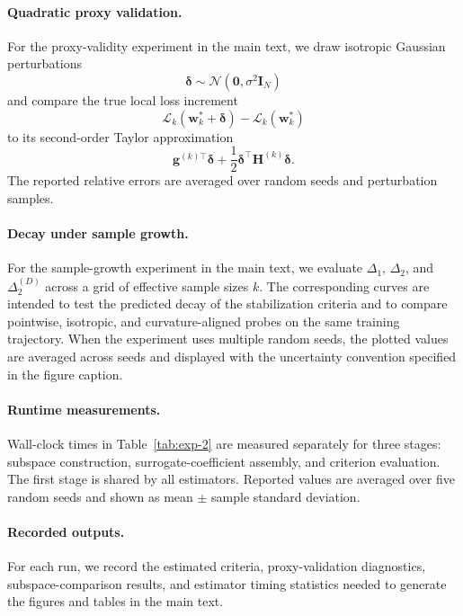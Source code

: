 \documentclass{article}
\begin{document}
\paragraph{Quadratic proxy validation.}
For the proxy-validity experiment in the main text, we draw isotropic Gaussian perturbations
\[
\boldsymbol{\delta}\sim\mathcal N(\mathbf 0,\sigma^2\mathbf I_N)
\]
and compare the true local loss increment
\[
\mathcal L_k(\mathbf w_k^*+\boldsymbol{\delta})-\mathcal L_k(\mathbf w_k^*)
\]
to its second-order Taylor approximation
\[
\mathbf g^{(k)\top}\boldsymbol{\delta}+\frac12\boldsymbol{\delta}^\top \mathbf H^{(k)}\boldsymbol{\delta}.
\]
The reported relative errors are averaged over random seeds and perturbation samples.

\paragraph{Decay under sample growth.}
For the sample-growth experiment in the main text, we evaluate $\Delta_1$, $\Delta_2$, and $\Delta_2^{(D)}$ across a grid of effective sample sizes $k$. The corresponding curves are intended to test the predicted decay of the stabilization criteria and to compare pointwise, isotropic, and curvature-aligned probes on the same training trajectory. When the experiment uses multiple random seeds, the plotted values are averaged across seeds and displayed with the uncertainty convention specified in the figure caption.

\paragraph{Runtime measurements.}
Wall-clock times in Table~\ref{tab:exp-2} are measured separately for three stages: subspace construction, surrogate-coefficient assembly, and criterion evaluation. The first stage is shared by all estimators. Reported values are averaged over five random seeds and shown as mean $\pm$ sample standard deviation.

\paragraph{Recorded outputs.}
For each run, we record the estimated criteria, proxy-validation diagnostics, subspace-comparison results, and estimator timing statistics needed to generate the figures and tables in the main text.


\newpage

\end{document}
